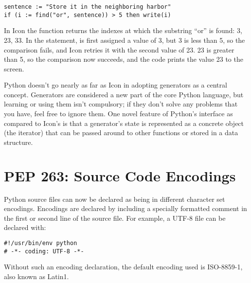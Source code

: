 \documentclass{howto}
\begin{document}
\begin{verbatim}
sentence := "Store it in the neighboring harbor"
if (i := find("or", sentence)) > 5 then write(i)
\end{verbatim}

In Icon the  function returns the indexes at which the
substring ``or'' is found: 3, 23, 33.  In the  statement,
 is first assigned a value of 3, but 3 is less than 5, so the
comparison fails, and Icon retries it with the second value of 23.  23
is greater than 5, so the comparison now succeeds, and the code prints
the value 23 to the screen.

Python doesn't go nearly as far as Icon in adopting generators as a
central concept.  Generators are considered a new part of the core
Python language, but learning or using them isn't compulsory; if they
don't solve any problems that you have, feel free to ignore them.
One novel feature of Python's interface as compared to
Icon's is that a generator's state is represented as a concrete object
(the iterator) that can be passed around to other functions or stored
in a data structure.

\begin{seealso}


\end{seealso}


\section{PEP 263: Source Code Encodings \label{section-encodings}}

Python source files can now be declared as being in different
character set encodings.  Encodings are declared by including a
specially formatted comment in the first or second line of the source
file.  For example, a UTF-8 file can be declared with:

\begin{verbatim}
#!/usr/bin/env python
# -*- coding: UTF-8 -*-
\end{verbatim}

Without such an encoding declaration, the default encoding used is
ISO-8859-1, also known as Latin1.
\end{document}
